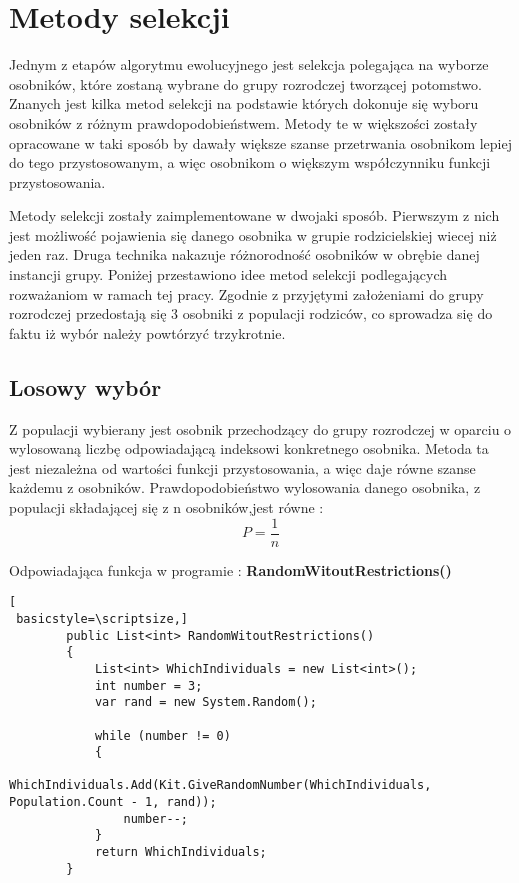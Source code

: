 \chapter{Metody selekcji}\label{metody_selekcji}

Jednym z etapów algorytmu ewolucyjnego jest selekcja polegająca na wyborze osobników, które zostaną wybrane do grupy rozrodczej tworzącej potomstwo. Znanych jest kilka metod selekcji na podstawie których dokonuje się wyboru osobników z różnym prawdopodobieństwem. Metody te w większości zostały opracowane w taki sposób by dawały większe szanse przetrwania osobnikom lepiej do tego przystosowanym, a więc osobnikom o większym współczynniku funkcji przystosowania. 

Metody selekcji zostały zaimplementowane w dwojaki sposób. Pierwszym z nich jest możliwość pojawienia się danego osobnika w grupie rodzicielskiej wiecej niż jeden raz. Druga technika nakazuje różnorodność osobników w obrębie danej instancji grupy. Poniżej przestawiono idee metod selekcji podlegających rozważaniom w ramach tej pracy. Zgodnie z przyjętymi założeniami do grupy rozrodczej przedostają się 3 osobniki z populacji rodziców, co sprowadza się do faktu iż wybór należy powtórzyć trzykrotnie.



\section{Losowy wybór}\label{sec:strukturaDokumentu}

Z populacji wybierany jest osobnik przechodzący do grupy rozrodczej w oparciu o  wylosowaną liczbę odpowiadającą indeksowi konkretnego osobnika. Metoda ta jest niezależna od wartości funkcji przystosowania, a więc daje równe szanse każdemu z osobników. Prawdopodobieństwo wylosowania danego osobnika, z populacji składającej się z n osobników,jest równe :
\vspace{0,4cm}
$$
P = \frac{1}{n}
$$

\par
Odpowiadająca funkcja w programie :\textbf{ RandomWitoutRestrictions()}

\begin{program}
\begin{lstlisting}[
 basicstyle=\scriptsize,]
        public List<int> RandomWitoutRestrictions()
        {
            List<int> WhichIndividuals = new List<int>();
            int number = 3;
            var rand = new System.Random();

            while (number != 0)
            {
                WhichIndividuals.Add(Kit.GiveRandomNumber(WhichIndividuals, Population.Count - 1, rand));
                number--;
            }
            return WhichIndividuals;
        }
\end{lstlisting}
\end{program}

